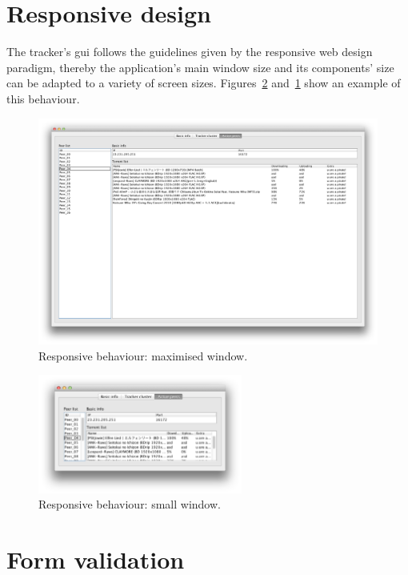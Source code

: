 \documentclass[twoside,a4paper,10pt]{article}
\begin{document}
\section{Responsive design}

The tracker's gui follows the guidelines given by the responsive web design
paradigm, thereby the application's main window size and its components' size
can be adapted to a variety of screen sizes.
Figures~\ref{fig:resp-small} and~\ref{fig:resp-maxi} show an example of this
behaviour.

\begin{figure}[!htp]
  \centering
  \includegraphics[width=\textwidth]{imgs/responsive_design_maximized.png}
  \caption{\label{fig:resp-maxi}Responsive behaviour: maximised window.}
\end{figure}

\begin{figure}[!htp]
  \centering
  \includegraphics[width=0.6\textwidth]{imgs/responsive_design.png}
  \caption{\label{fig:resp-small}Responsive behaviour: small window.}
\end{figure}

\FloatBarrier

\section{Form validation}
\end{document}
